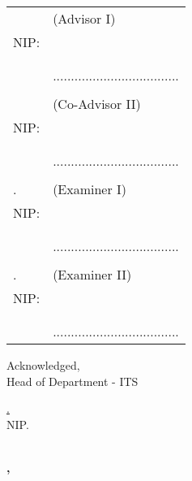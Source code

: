 \noindent
\begin{tabularx}{\textwidth}{X l}
  \advisor{}               & (Advisor I)                         \\
  NIP: \advisornip{}       &                                     \\
                           &                                     \\
                           &                                     \\
                           & ................................... \\                           
                           &                                     \\                           
  \coadvisor{}             & (Co-Advisor II)                     \\
  NIP: \coadvisornip{}     &                                     \\
                           &                                     \\
                           &                                     \\
                           & ................................... \\                           
                           &                                     \\                           
  \examinerone{}.          & (Examiner I)                        \\
  NIP: \examineronenip{}   &                                     \\
                           &                                     \\
                           &                                     \\
                           & ................................... \\                           
                           &                                     \\                           
  \examinertwo{}.          & (Examiner II)                       \\
  NIP: \examinertwonip{}   &                                     \\
                           &                                     \\
                           &                                     \\
                           & ................................... \\                          
\end{tabularx}
\endgroup


\begin{center}
  Acknowledged, \\
  Head of \engdepartment{} Department \engfacultyshort{} - ITS \\

  \vspace{8ex}

  \underline{\headofdepartment{}.} \\
  NIP. \headofdepartmentnip{}
\end{center}

\begin{center}
  \textbf{\MakeUppercase{\place{}}\\\ENGMONTH{}, \the\year{}}
\end{center}
\endgroup
